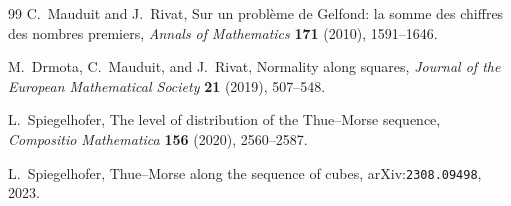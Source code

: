 \documentclass[11pt,oneside]{article}
\numberwithin{equation}{section}
\theoremstyle{definition}
\theoremstyle{remark}
\begin{document}
\begin{thebibliography}{99}
C.~Mauduit and J.~Rivat,
\newblock Sur un probl\`eme de Gelfond: la somme des chiffres des nombres
premiers,
\newblock \emph{Annals of Mathematics} \textbf{171} (2010), 1591--1646.

M.~Drmota, C.~Mauduit, and J.~Rivat,
\newblock Normality along squares,
\newblock \emph{Journal of the European Mathematical Society} \textbf{21}
(2019), 507--548.

L.~Spiegelhofer,
\newblock The level of distribution of the Thue--Morse sequence,
\newblock \emph{Compositio Mathematica} \textbf{156} (2020), 2560--2587.

L.~Spiegelhofer,
\newblock Thue--Morse along the sequence of cubes,
\newblock arXiv:\nolinkurl{2308.09498}, 2023.

\end{thebibliography}
\end{document}

